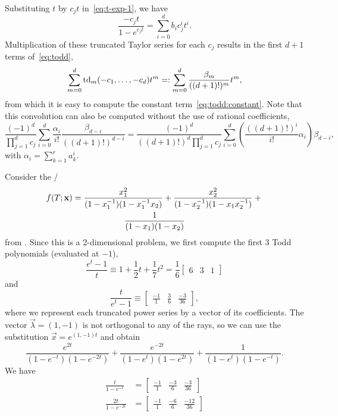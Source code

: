 Substituting $t$ by $c_j t$ in~\eqref{eq:t-exp-1}, we have
$$
\frac{-c_j t}{1-e^{c_j t}} = \sum_{i=0}^d b_i c_j^i t^i
.
$$
Multiplication of these truncated Taylor series for each $c_j$
results in the first $d+1$ terms of~\eqref{eq:todd},
$$
    \sum_{m=0}^{d} \operatorname{td}_m(-c_1, \ldots, -c_d) t^m
=:
    \sum_{m=0}^{d} \frac{\beta_m}{((d+1)!)^m} t^m
,
$$
from which
it is easy to compute the constant term~\eqref{eq:todd:constant}.
Note that this convolution can also be computed without the use
of rational coefficients,
$$
\frac{(-1)^d}{\prod_{j=1}^d c_j}
    \sum_{i=0}^d \frac{\alpha_i}{i!} \frac{\beta_{d-i}}{((d+1)!)^{d-i}}
=
\frac{(-1)^d}{((d+1)!)^d\prod_{j=1}^d c_j}
    \sum_{i=0}^d \left(\frac{((d+1)!)^i}{i!}\alpha_i\right) \beta_{d-i}
,
$$
with $\alpha_i = \sum_{k=1}^{r} a_k^i$.

\begin{example}
Consider the \rgf/
\begin{multline*}
\f T x =
\frac{x_1^2}{(1-x_1^{-1})(1-x_1^{-1}x_2)}
+
\frac{x_2^2}{(1-x_2^{-1})(1-x_1 x_2^{-1})}
+ {} \\
\frac1{(1-x_1)(1-x_2)}
\end{multline*}
from .
Since this is a 2-dimensional problem, we first compute the first
3 Todd polynomials (evaluated at $-1$),
$$
\frac{e^t -1}t \equiv
1 + \frac 1 2 t + \frac 1 7 t^2 =
\frac 1 6
\begin{bmatrix}
6 & 3 & 1
\end{bmatrix}
$$
and
$$
\frac t{e^t -1} \equiv
\begin{bmatrix}
\displaystyle\frac{-1}{1} & \displaystyle\frac{3}{6} & \displaystyle\frac{-3}{36}
\end{bmatrix}
,
$$
where we represent each truncated power series by a vector of its
coefficients.
The vector $\vec\lambda = (1, -1)$ is not
orthogonal to any of the rays, so we can use the substitution
$\vec x = e^{(1, -1)t}$
and obtain
$$
\frac{e^{2t}}{(1-e^{-t})(1-e^{-2t})}
+
\frac{e^{-2t}}{(1-e^{t})(1-e^{2t})}
+
\frac1{(1-e^{t})(1-e^{-t})}
.
$$
We have
\begin{align*}
\frac{t}{1-e^{- t}} & = 
\begin{bmatrix}
\displaystyle\frac{-1}{1} & \displaystyle\frac{-3}{6} & \displaystyle\frac{-3}{36}
\end{bmatrix}
\\
\frac{2t}{1-e^{-2 t}} & = 
\begin{bmatrix}
\displaystyle\frac{-1}{1} & \displaystyle\frac{-6}{6} & \displaystyle\frac{-12}{36}
\end{bmatrix}

\end{align*}
\end{example}
